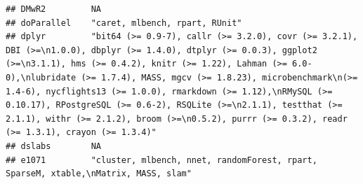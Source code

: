 \documentclass[]{article}
\begin{document}
\begin{verbatim}
## DMwR2         NA                                                                                                                                                                                                                                                                                                                                                                                                                                                                                                                                                                                        
## doParallel    "caret, mlbench, rpart, RUnit"                                                                                                                                                                                                                                                                                                                                                                                                                                                                                                                                                            
## dplyr         "bit64 (>= 0.9-7), callr (>= 3.2.0), covr (>= 3.2.1), DBI (>=\n1.0.0), dbplyr (>= 1.4.0), dtplyr (>= 0.0.3), ggplot2 (>=\n3.1.1), hms (>= 0.4.2), knitr (>= 1.22), Lahman (>= 6.0-0),\nlubridate (>= 1.7.4), MASS, mgcv (>= 1.8.23), microbenchmark\n(>= 1.4-6), nycflights13 (>= 1.0.0), rmarkdown (>= 1.12),\nRMySQL (>= 0.10.17), RPostgreSQL (>= 0.6-2), RSQLite (>=\n2.1.1), testthat (>= 2.1.1), withr (>= 2.1.2), broom (>=\n0.5.2), purrr (>= 0.3.2), readr (>= 1.3.1), crayon (>= 1.3.4)"                                                                                        
## dslabs        NA                                                                                                                                                                                                                                                                                                                                                                                                                                                                                                                                                                                        
## e1071         "cluster, mlbench, nnet, randomForest, rpart, SparseM, xtable,\nMatrix, MASS, slam"                                                                                                                                                                                                                                                                                                                                                                                                                                                                                                       

\end{verbatim}
\end{document}
